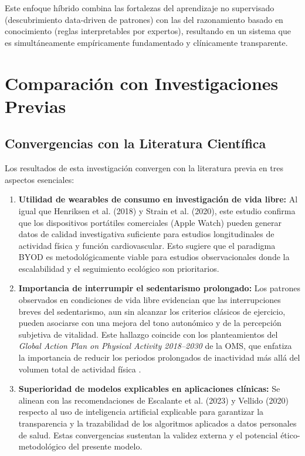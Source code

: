 Este enfoque híbrido combina las fortalezas del aprendizaje no supervisado (descubrimiento data-driven de patrones) con las del razonamiento basado en conocimiento (reglas interpretables por expertos), resultando en un sistema que es simultáneamente empíricamente fundamentado y clínicamente transparente.


\section{Comparación con Investigaciones Previas}
\label{sec:comparacion_investigaciones}

\subsection{Convergencias con la Literatura Científica}
\label{subsec:convergencias}

Los resultados de esta investigación convergen con la literatura previa en tres aspectos esenciales:

\begin{enumerate}
    \item \textbf{Utilidad de wearables de consumo en investigación de vida libre:} Al igual que Henriksen et al. (2018) y Strain et al. (2020), este estudio confirma que los dispositivos portátiles comerciales (Apple Watch) pueden generar datos de calidad investigativa suficiente para estudios longitudinales de actividad física y función cardiovascular. Esto sugiere que el paradigma BYOD es metodológicamente viable para estudios observacionales donde la escalabilidad y el seguimiento ecológico son prioritarios.
    
    \item \textbf{Importancia de interrumpir el sedentarismo prolongado:} Los patrones observados en condiciones de vida libre evidencian que las interrupciones breves del sedentarismo, aun sin alcanzar los criterios clásicos de ejercicio, pueden asociarse con una mejora del tono autonómico y de la percepción subjetiva de vitalidad. Este hallazgo coincide con los planteamientos del \textit{Global Action Plan on Physical Activity 2018--2030} de la OMS, que enfatiza la importancia de reducir los periodos prolongados de inactividad más allá del volumen total de actividad física \cite{WHO2018,Bull2020}.
    
    \item \textbf{Superioridad de modelos explicables en aplicaciones clínicas:} Se alinean con las recomendaciones de Escalante et al. (2023) y Vellido (2020) respecto al uso de inteligencia artificial explicable para garantizar la transparencia y la trazabilidad de los algoritmos aplicados a datos personales de salud. Estas convergencias sustentan la validez externa y el potencial ético-metodológico del presente modelo.
\end{enumerate}

